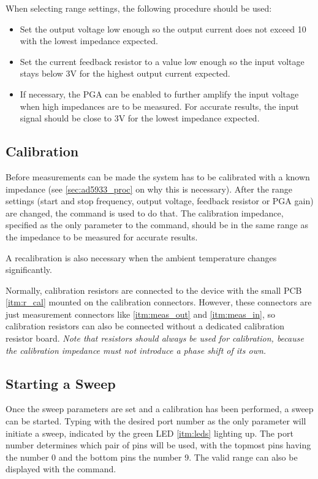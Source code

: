 When selecting range settings, the following procedure should be used:
\begin{itemize}
	\item Set the output voltage low enough so the output current does not exceed \unit{10}{\milli\ampere} with the
    lowest impedance expected.
  \item Set the current feedback resistor to a value low enough so the input voltage stays below 3V for the highest
    output current expected.
  \item If necessary, the PGA can be enabled to further amplify the input voltage when high impedances are to be
    measured. For accurate results, the input signal should be close to 3V for the lowest impedance expected.
\end{itemize}

\subsection{Calibration}

Before measurements can be made the system has to be calibrated with a known impedance (see \autoref{sec:ad5933_proc}
on why this is necessary). After the range settings (start and stop frequency, output voltage, feedback resistor or
PGA gain) are changed, the  command is used to do that. The calibration impedance, specified
as the only parameter to the command, should be in the same range as the impedance to be measured for accurate results.

A recalibration is also necessary when the ambient temperature changes significantly.

Normally, calibration resistors are connected to the device with the small PCB \ref{itm:r_cal} mounted on the
calibration connectors. However, these connectors are just measurement connectors like \ref{itm:meas_out} and
\ref{itm:meas_in}, so calibration resistors can also be connected without a dedicated calibration resistor board.
\emph{Note that resistors should always be used for calibration, because the calibration impedance must not introduce
  a phase shift of its own.}

\subsection{Starting a Sweep}

Once the sweep parameters are set and a calibration has been performed, a sweep can be started.
Typing  with the desired port number as the only parameter will initiate a sweep, indicated by
the green LED \ref{itm:leds} lighting up. The port number determines which pair of pins will be used, with the topmost
pins having the number 0 and the bottom pins the number 9. The valid range can also be displayed with the
 command.

